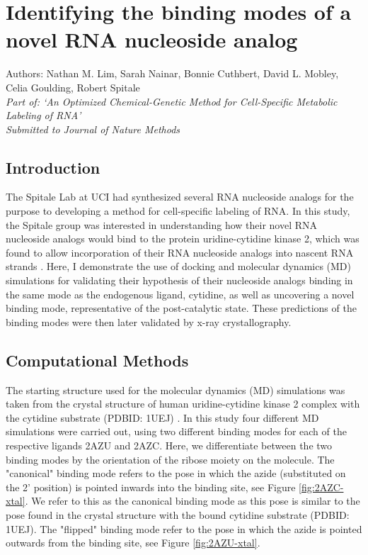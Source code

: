 \chapter{Identifying the binding modes of a novel RNA nucleoside analog} \label{UCK2}

\small{Authors: Nathan M. Lim, Sarah Nainar, Bonnie Cuthbert, David L. Mobley, Celia Goulding, Robert Spitale}\\
\emph{Part of: `An Optimized Chemical-Genetic Method for Cell-Specific Metabolic Labeling of RNA' \cite{uck2paper}}\\
\emph{Submitted to Journal of Nature Methods}

\section{Introduction}
The Spitale Lab at UCI had synthesized several RNA nucleoside analogs for the purpose to developing a method for cell-specific labeling of RNA.
In this study, the Spitale group was interested in understanding how their novel RNA nucleoside analogs would bind to the protein uridine-cytidine kinase 2, which was found to allow incorporation of their RNA nucleoside analogs into nascent RNA strands \cite{}.
Here, I demonstrate the use of docking and molecular dynamics (MD) simulations for validating their hypothesis of their nucleoside analogs binding in the same mode as the endogenous ligand, cytidine, as well as uncovering a novel binding mode, representative of the post-catalytic state.
These predictions of the binding modes were then later validated by x-ray crystallography.

\section{Computational Methods}
The starting structure used for the molecular dynamics (MD) simulations was taken from the crystal structure of human uridine-cytidine kinase 2 complex with the cytidine substrate (PDBID: 1UEJ) \cite{suzuki2004structural}.
In this study four different MD simulations were carried out, using two different binding modes for each of the respective ligands 2AZU and 2AZC.
Here, we differentiate between the two binding modes by the orientation of the ribose moiety on the molecule. 
The "canonical" binding mode refers to the pose in which the azide (substituted on the 2' position) is pointed inwards into the binding site, see Figure \ref{fig:2AZC-xtal}.
We refer to this as the canonical binding mode as this pose is similar to the pose found in the crystal structure with the bound cytidine substrate (PDBID: 1UEJ).
The "flipped" binding mode refer to the pose in which the azide is pointed outwards from the binding site, see Figure \ref{fig:2AZU-xtal}.

